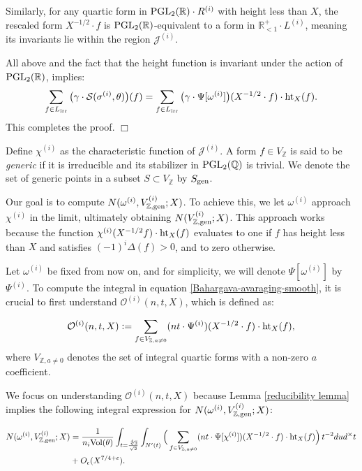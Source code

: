 \documentclass{article}
\def\PGL{{\rm PGL}}
\def\irr{{\rm irr}}
\def\gen{{\rm gen}}
\def\Vol{{\rm Vol}}
\def \h{{\rm ht}}
\newenvironment{proof}{\noindent {\bf Proof:}}{$\Box$ \vspace{2 ex}}
\def \Bo{{\mathcal{O}^{(i)}(n,t,X)}}
\def \dw{{t^{-2}dud^\times t  }}
\begin{document}
\begin{proof}
Similarly, for any quartic form in $\PGL_2(\mathbb{R}) \cdot R^{(i)}$ with height less than $X$, the rescaled form $X^{-1/2} \cdot f$ is $\PGL_2(\mathbb{R})$-equivalent to a form in $\mathbb{R}^{+}_{<1} \cdot L^{(i)}$, meaning its invariants lie within the region $\mathcal{J}^{(i)}$.

All above and the fact that the height function is invariant under the action of $\PGL_2(\mathbb{R})$, implies:
\begin{equation*}
  \sum_{f \in L_{\irr}} \big(\gamma \cdot \mathcal{S}(\sigma^{(i)}, \theta)\big)(f) = \sum_{f \in L_{\irr}} \big(\gamma \cdot \Psi[\omega^{(i)}]\big)(X^{-1/2} \cdot f) \cdot \h_X(f).
\end{equation*}
This completes the proof.
\end{proof}



Define $\chi^{(i)}$ as the characteristic function of $\mathcal{J}^{(i)}$. A form $f \in V_{\mathbb{Z}}$ is said to be \textit{generic} if it is irreducible and its stabilizer in $\PGL_2(\mathbb{Q})$ is trivial. We denote the set of generic points in a subset $S \subset V_{\mathbb{Z}}$ by $S_{\gen}$.

Our goal is to compute $N(\omega^{(i)}, V_{\mathbb{Z}, \gen}^{(i)}; X)$. To achieve this, we let $\omega^{(i)}$ approach $\chi^{(i)}$ in the limit, ultimately obtaining $N(V_{\mathbb{Z}, \gen}^{(i)}; X)$. This approach works because the function $\chi^{(i)}(X^{-1/2} f) \cdot \h_X(f)$ evaluates to one if $f$ has height less than $X$ and satisfies $(-1)^i \Delta(f) > 0$, and to zero otherwise.


Let $\omega^{(i)}$ be fixed from now on, and for simplicity, we will denote $\Psi[\omega^{(i)}]$ by $\Psi^{(i)}$. 
To compute the integral in equation \eqref{Bahargava-avaraging-smooth}, it is crucial to first understand $\Bo$, which is defined as:

\begin{equation}\label{def Bo} \Bo \vcentcolon = \sum_{f \in V_{\mathbb{Z}, a \neq 0}} (nt \cdot \Psi^{(i)})(X^{-1/2} \cdot f) \cdot \h_{X}(f), \end{equation}
where $V_{\mathbb{Z}, a \neq 0}$ denotes the set of integral quartic forms with a non-zero $a$ coefficient.

We focus on understanding $\Bo$ because Lemma \ref{reducibility lemma} implies the following integral expression for $N(\omega^{(i)}, V_{\mathbb{Z}, \gen}^{(i)}; X)$:

\begin{align*}\label{integral} N(\omega^{(i)}, V_{\mathbb{Z}, \gen}^{(i)}; X)
&= \frac{1}{n_i \Vol(\theta)} \int_{t = \frac{\sqrt[4]{3}}{\sqrt{2}}} \int_{N'(t)} \Big( \sum_{f \in V_{\mathbb{Z}, a \neq 0}} (nt \cdot \Psi[\chi^{(i)}])(X^{-1/2} \cdot f)  \cdot \h_{X}(f) \Big)\, \dw \\ & + O_{\epsilon}(X^{7/4+\epsilon}). \end{align*}
\end{document}
